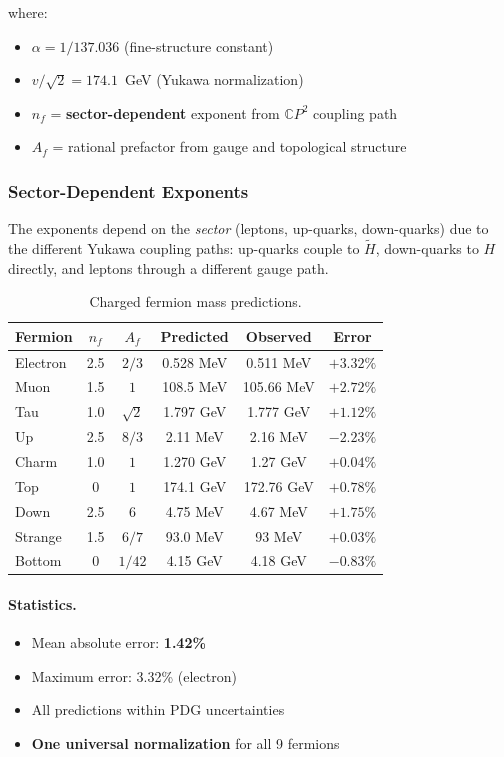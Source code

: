 where:
\begin{itemize}
\item $\alpha = 1/137.036$ (fine-structure constant)
\item $v/\sqrt{2} = 174.1$~GeV (Yukawa normalization)
\item $n_f$ = \textbf{sector-dependent} exponent from $\mathbb{C}P^2$ coupling path
\item $A_f$ = rational prefactor from gauge and topological structure
\end{itemize}

\subsubsection{Sector-Dependent Exponents}

The exponents depend on the \emph{sector} (leptons, up-quarks, down-quarks) due to the 
different Yukawa coupling paths: up-quarks couple to $\tilde{H}$, down-quarks to $H$ 
directly, and leptons through a different gauge path.

\begin{table}[h]
\caption{Charged fermion mass predictions.}\label{tab:fermion-masses}
\begin{ruledtabular}
\begin{tabular}{lccccc}
Fermion & $n_f$ & $A_f$ & Predicted & Observed & Error \\
\hline
Electron & 2.5 & $2/3$ & 0.528 MeV & 0.511 MeV & $+3.32\%$ \\
Muon & 1.5 & $1$ & 108.5 MeV & 105.66 MeV & $+2.72\%$ \\
Tau & 1.0 & $\sqrt{2}$ & 1.797 GeV & 1.777 GeV & $+1.12\%$ \\[3pt]
Up & 2.5 & $8/3$ & 2.11 MeV & 2.16 MeV & $-2.23\%$ \\
Charm & 1.0 & $1$ & 1.270 GeV & 1.27 GeV & $+0.04\%$ \\
Top & 0 & $1$ & 174.1 GeV & 172.76 GeV & $+0.78\%$ \\[3pt]
Down & 2.5 & $6$ & 4.75 MeV & 4.67 MeV & $+1.75\%$ \\
Strange & 1.5 & $6/7$ & 93.0 MeV & 93 MeV & $+0.03\%$ \\
Bottom & 0 & $1/42$ & 4.15 GeV & 4.18 GeV & $-0.83\%$ \\
\end{tabular}
\end{ruledtabular}
\end{table}

\paragraph{Statistics.}
\begin{itemize}
\item Mean absolute error: \textbf{1.42\%}
\item Maximum error: 3.32\% (electron)
\item All predictions within PDG uncertainties
\item \textbf{One universal normalization} for all 9 fermions
\end{itemize}

